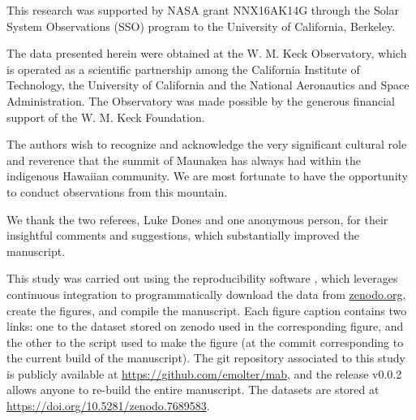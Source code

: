 \documentclass[preprint]{aastex631}
\begin{document}
\begin{acknowledgements}

This research was supported by NASA grant NNX16AK14G through
the Solar System Observations (SSO) program to the University of
California, Berkeley.

The data presented herein were obtained at the W. M. Keck Observatory, which is operated as a scientific partnership among the California Institute of Technology, the University of California and the National Aeronautics and Space Administration. The Observatory was made possible by the generous financial support of the W. M. Keck Foundation.

The authors wish to recognize and acknowledge the very significant cultural role and reverence that the summit of Maunakea has always had within the indigenous Hawaiian community.  We are most fortunate to have the opportunity to conduct observations from this mountain.

We thank the two referees, Luke Dones and one anonymous person, for their insightful comments and suggestions, which substantially improved the manuscript.

This study was carried out using the reproducibility software
\href{https://github.com/showyourwork/showyourwork}{\showyourwork}
\citep{luger21}, which leverages continuous integration to
programmatically download the data from
\href{https://zenodo.org/}{zenodo.org}, create the figures, and
compile the manuscript. Each figure caption contains two links: one
to the dataset stored on zenodo used in the corresponding figure,
and the other to the script used to make the figure (at the commit
corresponding to the current build of the manuscript). The git
repository associated to this study is publicly available at
\url{https://github.com/emolter/mab}, and the release
v0.0.2 allows anyone to re-build the entire manuscript. The datasets
are stored at \url{https://doi.org/10.5281/zenodo.7689583}.

\end{acknowledgements}



\appendix
\end{document}
